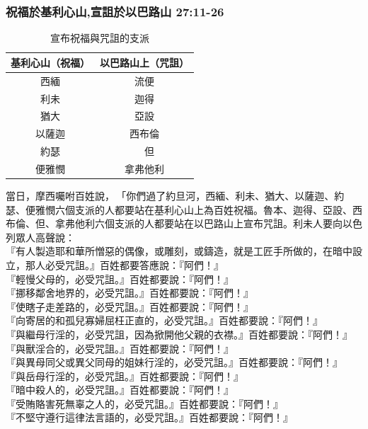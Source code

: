 \subsubsection{祝福於基利心山,宣詛於以巴路山 27:11-26}
\begin{table}
\vspace*{-10mm}
\centering
\begin{tabular}{|c|c|}
\hline
\hline
基利心山（祝福）& 以巴路山上（咒詛）   \\\hline
西緬& 流便    \\\hline
利未& 迦得\\\hline
猶大&亞設 \\\hline
以薩迦&西布倫　\\\hline
約瑟&　但\\\hline
便雅憫&拿弗他利　\\\hline
\end{tabular}
\caption{宣布祝福與咒詛的支派}
\end{table}
當日，摩西囑咐百姓說， 「你們過了約旦河，西緬、利未、猶大、以薩迦、約瑟、便雅憫六個支派的人都要站在基利心山上為百姓祝福。魯本、迦得、亞設、西布倫、但、拿弗他利六個支派的人都要站在以巴路山上宣布咒詛。利未人要向以色列眾人高聲說：\\
『有人製造耶和華所憎惡的偶像，或雕刻，或鑄造，就是工匠手所做的，在暗中設立，那人必受咒詛。』百姓都要答應說：『阿們！』\\
『輕慢父母的，必受咒詛。』百姓都要說：『阿們！』\\
『挪移鄰舍地界的，必受咒詛。』百姓都要說：『阿們！』\\
『使瞎子走差路的，必受咒詛。』百姓都要說：『阿們！』\\
『向寄居的和孤兒寡婦屈枉正直的，必受咒詛。』百姓都要說：『阿們！』\\
『與繼母行淫的，必受咒詛，因為掀開他父親的衣襟。』百姓都要說：『阿們！』\\
『與獸淫合的，必受咒詛。』百姓都要說：『阿們！』\\
『與異母同父或異父同母的姐妹行淫的，必受咒詛。』百姓都要說：『阿們！』\\
『與岳母行淫的，必受咒詛。』百姓都要說：『阿們！』\\
『暗中殺人的，必受咒詛。』百姓都要說：『阿們！』\\
『受賄賂害死無辜之人的，必受咒詛。』百姓都要說：『阿們！』\\
『不堅守遵行這律法言語的，必受咒詛。』百姓都要說：『阿們！』\\



